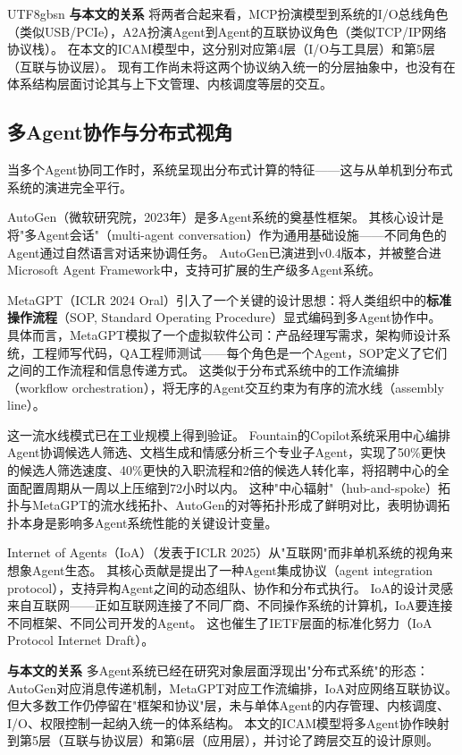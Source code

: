 \documentclass[11pt,a4paper]{article}
\begin{document}
\begin{CJK*}{UTF8}{gbsn}
\textbf{与本文的关系}
将两者合起来看，MCP扮演模型到系统的I/O总线角色（类似USB/PCIe），A2A扮演Agent到Agent的互联协议角色（类似TCP/IP网络协议栈）。
在本文的ICAM模型中，这分别对应第4层（I/O与工具层）和第5层（互联与协议层）。
现有工作尚未将这两个协议纳入统一的分层抽象中，也没有在体系结构层面讨论其与上下文管理、内核调度等层的交互。

\subsection{多Agent协作与分布式视角}
\label{sec:related-multiagent}

当多个Agent协同工作时，系统呈现出分布式计算的特征——这与从单机到分布式系统的演进完全平行。

AutoGen\cite{wu2023autogen}（微软研究院，2023年）是多Agent系统的奠基性框架。
其核心设计是将"多Agent会话"（multi-agent conversation）作为通用基础设施——不同角色的Agent通过自然语言对话来协调任务。
AutoGen已演进到v0.4版本，并被整合进Microsoft Agent Framework中，支持可扩展的生产级多Agent系统。

MetaGPT\cite{metagpt2023}（ICLR 2024 Oral）引入了一个关键的设计思想：将人类组织中的\textbf{标准操作流程}（SOP, Standard Operating Procedure）显式编码到多Agent协作中。
具体而言，MetaGPT模拟了一个虚拟软件公司：产品经理写需求，架构师设计系统，工程师写代码，QA工程师测试——每个角色是一个Agent，SOP定义了它们之间的工作流程和信息传递方式。
这类似于分布式系统中的工作流编排（workflow orchestration），将无序的Agent交互约束为有序的流水线（assembly line）。

这一流水线模式已在工业规模上得到验证。
Fountain的Copilot系统采用中心编排Agent协调候选人筛选、文档生成和情感分析三个专业子Agent，实现了50\%更快的候选人筛选速度、40\%更快的入职流程和2倍的候选人转化率，将招聘中心的全面配置周期从一周以上压缩到72小时以内\cite{anthropic2026agenticreport}。
这种"中心辐射"（hub-and-spoke）拓扑与MetaGPT的流水线拓扑、AutoGen的对等拓扑形成了鲜明对比，表明协调拓扑本身是影响多Agent系统性能的关键设计变量\cite{wu2023autogen,metagpt2023}。

Internet of Agents（IoA）\cite{ioa2024}（发表于ICLR 2025）从"互联网"而非单机系统的视角来想象Agent生态。
其核心贡献是提出了一种Agent集成协议（agent integration protocol），支持异构Agent之间的动态组队、协作和分布式执行。
IoA的设计灵感来自互联网——正如互联网连接了不同厂商、不同操作系统的计算机，IoA要连接不同框架、不同公司开发的Agent。
这也催生了IETF层面的标准化努力（IoA Protocol Internet Draft）。

\textbf{与本文的关系}
多Agent系统已经在研究对象层面浮现出"分布式系统"的形态：AutoGen对应消息传递机制，MetaGPT对应工作流编排，IoA对应网络互联协议。
但大多数工作仍停留在"框架和协议"层，未与单体Agent的内存管理、内核调度、I/O、权限控制一起纳入统一的体系结构。
本文的ICAM模型将多Agent协作映射到第5层（互联与协议层）和第6层（应用层），并讨论了跨层交互的设计原则。


\end{CJK*}
\end{document}
